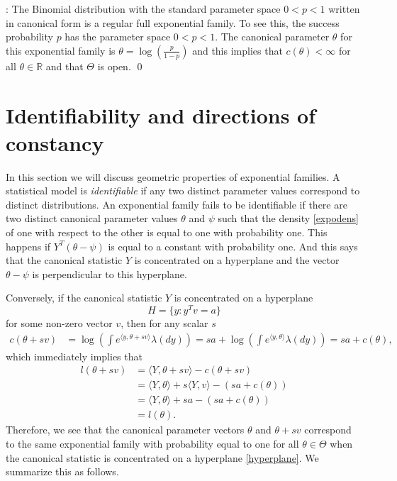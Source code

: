 \documentclass[12pt]{article}
\newcommand{\R}{\mathbb{R}}
\newcommand{\inner}[1]{\langle #1 \rangle}
\begin{document}
\vspace{0.5cm}: The Binomial distribution with the standard parameter space $0 < p < 1$ written in canonical form is a regular full exponential family. To see this, the success probability $p$ has the parameter space $0 < p < 1$. The canonical parameter $\theta$ for this exponential family is $\theta = \log\left(\frac{p}{1-p}\right)$ and this implies that $c(\theta) < \infty$ for all $\theta \in \R$ and that $\Theta$ is open. \qed


\section*{Identifiability and directions of constancy}

In this section we will discuss geometric properties of exponential families. A statistical model is \emph{identifiable} if any two distinct parameter values correspond to distinct distributions.	An exponential family fails to be identifiable if there are two distinct canonical parameter values $\theta$ and $\psi$ such that the density \eqref{expodens} of one with respect to the other is equal to one with probability one. This happens if $Y^T(\theta - \psi)$ is equal to a constant with probability one. And this says that the canonical statistic $Y$ is concentrated on a hyperplane and the vector $\theta - \psi$ is perpendicular to this hyperplane.

Conversely, if the canonical statistic $Y$ is concentrated on a hyperplane
\begin{equation}\label{hyperplane}
  H = \{y : y^Tv = a\}	
\end{equation}
for some non-zero vector $v$, then for any scalar $s$ 
\begin{align*}
  c(\theta + sv) &= \log\left(\int e^{\inner{y, \theta + sv}}\lambda(dy)\right)	= sa + \log\left(\int e^{\inner{y,\theta}}\lambda(dy)\right) = sa + c(\theta),
\end{align*}
which immediately implies that
\begin{align*}
  l(\theta + sv) &= \inner{Y,\theta +sv} - c(\theta + sv) \\	
    &= \inner{Y,\theta} + s\inner{Y,v} - \left(sa + c(\theta)\right) \\
    &= \inner{Y,\theta} + sa - \left(sa + c(\theta)\right) \\    
    &= l(\theta).
\end{align*}
Therefore, we see that the canonical parameter vectors $\theta$ and $\theta + sv$ correspond to the same exponential family with probability equal to one for all $\theta \in \Theta$ when the canonical statistic is concentrated on a hyperplane \eqref{hyperplane}. We summarize this as follows.
\end{document}
